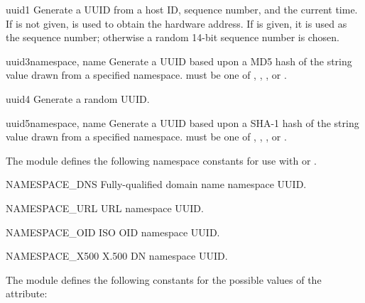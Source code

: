 \begin{funcdesc}{uuid1}{}
Generate a UUID from a host ID, sequence number, and the current time.
If  is not given,  is used to obtain the
hardware address.
If  is given, it is used as the sequence number;
otherwise a random 14-bit sequence number is chosen.
\end{funcdesc}

\begin{funcdesc}{uuid3}{namespace, name}
Generate a UUID based upon a MD5 hash of the  string value 
drawn from a specified namespace.    
must be one of ,
, , 
or .
\end{funcdesc}

\begin{funcdesc}{uuid4}{}
Generate a random UUID.
\end{funcdesc}

\begin{funcdesc}{uuid5}{namespace, name}
Generate a UUID based upon a SHA-1 hash of the  string value 
drawn from a specified namespace.    
must be one of ,
, , 
or .
\end{funcdesc}

The  module defines the following namespace constants 
for use with  or .

\begin{datadesc}{NAMESPACE_DNS}
Fully-qualified domain name namespace UUID.
\end{datadesc}

\begin{datadesc}{NAMESPACE_URL}
URL namespace UUID.
\end{datadesc}

\begin{datadesc}{NAMESPACE_OID}
ISO OID namespace UUID.
\end{datadesc}

\begin{datadesc}{NAMESPACE_X500}
X.500 DN namespace UUID.
\end{datadesc}

The  module defines the following constants 
for the possible values of the  attribute:

